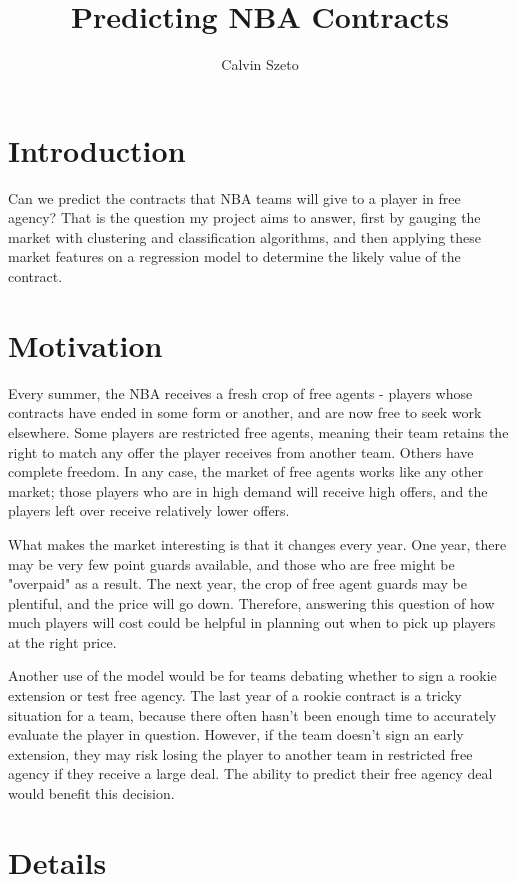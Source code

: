 \documentclass{article}
\title{Predicting NBA Contracts}
\author{Calvin Szeto}
\begin{document}
\maketitle

\section{Introduction}

Can we predict the contracts that NBA teams will give to a player in free agency? 
That is the question my project aims to answer, first by gauging the market with clustering and classification algorithms, and then applying these market features on a regression model to determine the likely value of the contract.

\section{Motivation}

Every summer, the NBA receives a fresh crop of free agents - players whose contracts have ended in some form or another, and are now free to seek work elsewhere. 
Some players are restricted free agents, meaning their team retains the right to match any offer the player receives from another team. Others have complete freedom.
In any case, the market of free agents works like any other market; those players who are in high demand will receive high offers, and the players left over receive relatively lower offers.

What makes the market interesting is that it changes every year. One year, there may be very few point guards available, and those who are free might be "overpaid" as a result. The next year, the crop of free agent guards may be plentiful, and the price will go down. Therefore, answering this question of how much players will cost could be helpful in planning out when to pick up players at the right price.

Another use of the model would be for teams debating whether to sign a rookie extension or test free agency. The last year of a rookie contract is a tricky situation for a team, because there often hasn't been enough time to accurately evaluate the player in question. 
However, if the team doesn't sign an early extension, they may risk losing the player to another team in restricted free agency if they receive a large deal.
The ability to predict their free agency deal would benefit this decision.

\section{Details}
\end{document}
